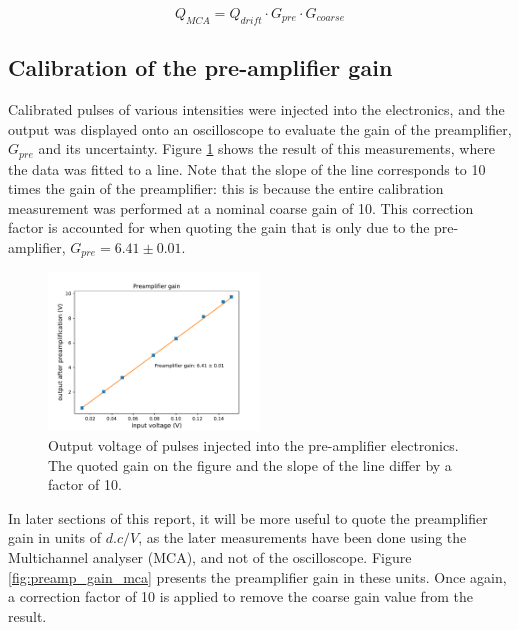 \begin{equation}
  \label{eq:gain_system}
  Q_{MCA} = Q_{drift}\cdot G_{pre}\cdot G_{coarse}
\end{equation}


\subsection{Calibration of the pre\--amp\-li\-fi\-er gain}
 Calibrated pulses of various intensities were injected into the electronics, and the output was displayed onto an oscilloscope to evaluate the gain of the preamplifier, $G_{pre}$ and its uncertainty. Figure \ref{fig:preamp_gain} shows the result of this measurements, where the data was fitted to a line. Note that the slope of the line corresponds to 10 times the gain of the preamplifier: this is because the entire calibration measurement was performed at a nominal coarse gain of 10. This correction factor is accounted for when quoting the gain that is only due to the pre\--amplifier, $G_{pre} = 6.41 \pm 0.01$.

\begin{figure}[htb]
  \includegraphics[scale=0.5,width=0.5\textwidth]{graphics/preamp_gain_calibration.pdf}
  \caption{Output voltage of pulses injected into the pre\--amplifier electronics. The quoted gain on the figure and the slope of the line differ by a factor of 10.}
  \label{fig:preamp_gain}
\end{figure}

In later sections of this report, it will be more useful to quote the preamplifier gain in units of $d.c/V$, as the later measurements have been done using the Multichannel analyser (MCA), and not of the oscilloscope. Figure \ref{fig:preamp_gain_mca} presents the preamplifier gain in these units. Once again, a correction factor of 10 is applied to remove the coarse gain value from the result.

